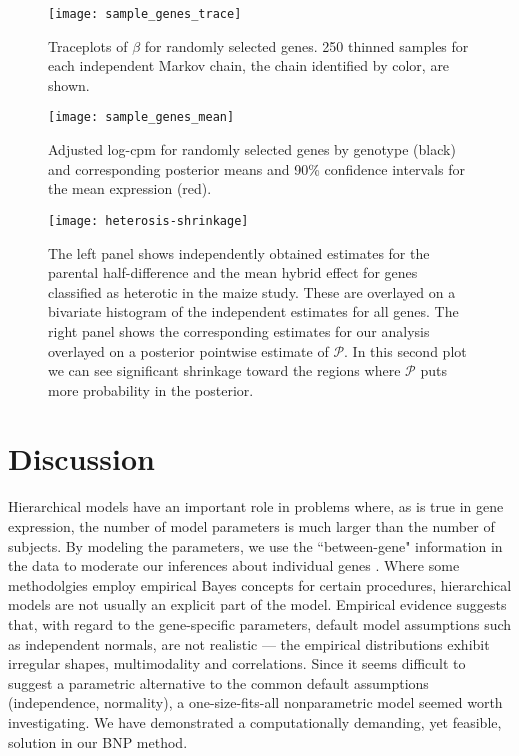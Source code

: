 {{\begin{figure}
\texttt{[image: sample\_genes\_trace]}
\begin{minipage}{.8\textwidth}
\caption{Traceplots of $\beta$ for randomly selected genes. 250 thinned samples for each independent Markov chain, the chain identified by color, are shown.}
\label{mixing}
\end{minipage}
\end{figure}

\begin{figure}
\texttt{[image: sample\_genes\_mean]}
\begin{minipage}{.8\textwidth}
\caption{Adjusted log-cpm for randomly selected genes by genotype (black) and corresponding posterior means and 90\% confidence intervals for the mean expression (red).}
\label{compare-cis}
\end{minipage}
\end{figure}
}





\begin{figure}[h!]
\centering
\texttt{[image: heterosis-shrinkage]}
\begin{minipage}{.8\textwidth}
\caption{\small The left panel shows independently obtained estimates for the parental half-difference and the mean hybrid effect for genes classified as heterotic in the maize study. These are overlayed on a bivariate histogram of the independent estimates for all genes. The right
panel shows the corresponding estimates for our analysis overlayed on a posterior pointwise estimate of $\mathcal{P}$. In this second plot we can see significant shrinkage toward the regions where $\mathcal{P}$ puts more probability in the posterior.}
\label{het-shrink}
\end{minipage}
\end{figure}

\section{Discussion}
\label{sec:discussion}
Hierarchical models have an important role in problems where, as is true in gene expression, the number of model parameters is much larger than the number of subjects. By modeling the parameters, we use the ``between-gene" information in the data to moderate our inferences about individual genes . Where some methodolgies employ empirical Bayes concepts for certain procedures, hierarchical models are not usually an explicit part of the model. Empirical evidence suggests that, with regard to the gene-specific parameters, default model assumptions such as independent normals, are not realistic --- the empirical distributions exhibit irregular shapes, multimodality and correlations. Since it seems difficult to suggest a parametric alternative to the common default assumptions (independence, normality), a one-size-fits-all nonparametric model seemed worth investigating. We have demonstrated a computationally demanding, yet feasible, solution in our BNP method.

}
